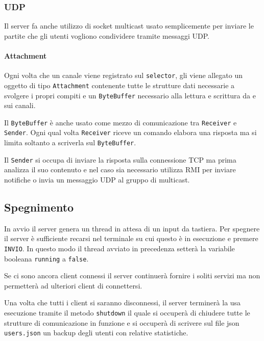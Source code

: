 \subsubsection{UDP}
Il server fa anche utilizzo di socket multicast usato semplicemente per inviare le partite che gli
utenti vogliono condividere tramite messaggi UDP.

\paragraph{Attachment}
Ogni volta che un canale viene registrato sul \verb|selector|, gli viene allegato un oggetto di
tipo \verb|Attachment| contenente tutte le strutture dati necessarie a svolgere i propri compiti
e un \verb|ByteBuffer| necessario alla lettura e scrittura da e sui canali.

Il \verb|ByteBuffer| è anche usato come mezzo di comunicazione tra \verb|Receiver| e
\verb|Sender|. Ogni qual volta \verb|Receiver| riceve un comando elabora una risposta ma si limita
soltanto a scriverla sul \verb|ByteBuffer|.

Il \verb|Sender| si occupa di inviare la risposta sulla connessione TCP ma prima analizza il suo
contenuto e nel caso sia necessario utilizza RMI per inviare notifiche o invia un messaggio UDP al
gruppo di multicast.

\subsection{Spegnimento}
In avvio il server genera un thread in attesa di un input da tastiera. Per spegnere il server è
sufficiente recarsi nel terminale su cui questo è in esecuzione e premere \verb|INVIO|. In questo
modo il thread avviato in precedenza setterà la variabile booleana \verb|running| a \verb|false|.

Se ci sono ancora client connessi il server continuerà fornire i soliti servizi ma non permetterà
ad ulteriori client di connettersi.

Una volta che tutti i client si saranno disconnessi, il server terminerà la usa esecuzione tramite
il metodo \verb|shutdown| il quale si occuperà di chiudere tutte le strutture di comunicazione
in funzione e si occuperà di scrivere sul file json \verb|users.json| un backup degli utenti con
relative statistiche.